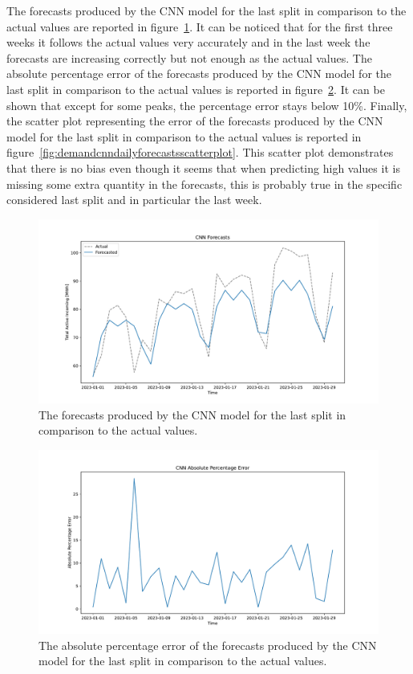 The forecasts produced by the CNN model for the last split in comparison to the actual values are reported in figure~\ref{fig:demandcnndailyforecasts}.
It can be noticed that for the first three weeks it follows the actual values very accurately and in the last week the forecasts are increasing correctly but not enough as the actual values.
The absolute percentage error of the forecasts produced by the CNN model for the last split in comparison to the actual values is reported in figure~\ref{fig:demandcnndailyforecastsmape}.
It can be shown that except for some peaks, the percentage error stays below 10\%.
Finally, the scatter plot representing the error of the forecasts produced by the CNN model for the last split in comparison to the actual values is reported in figure~\ref{fig:demandcnndailyforecastsscatterplot}.
This scatter plot demonstrates that there is no bias even though it seems that when predicting high values it is missing some extra quantity in the forecasts, this is probably true in the specific considered last split and in particular the last week.

\begin{figure}[H]
\centering
\includegraphics[width=1\textwidth]{images/demand/CNN_daily_aggregated}
\caption{The forecasts produced by the CNN model for the last split in comparison to the actual values.}
\label{fig:demandcnndailyforecasts}
\end{figure}

\begin{figure}[H]
\centering
\includegraphics[width=1\textwidth]{images/demand/CNN_daily_aggregated_mape}
\caption{The absolute percentage error of the forecasts produced by the CNN model for the last split in comparison to the actual values.}
\label{fig:demandcnndailyforecastsmape}
\end{figure}

